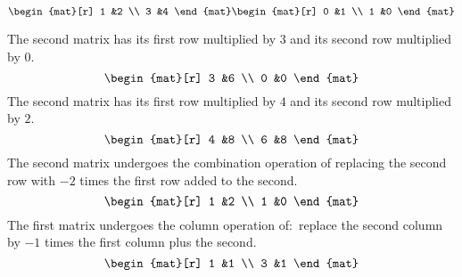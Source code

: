 \begin{exercises}
\begin{exparts*}
\begin{mat}[r]
               \end{mat} \)
      \partsitem \( \begin{mat}[r]
                 1  &2  \\
                 3  &4
               \end{mat}
               \begin{mat}[r]
                 0  &1  \\
                 1  &0
               \end{mat} \)
    \end{exparts*}
    \begin{answer}
      \begin{exparts}
        \partsitem The second matrix has its first row multiplied 
          by \( 3 \) and
          its second row multiplied by \( 0 \).
          \begin{equation*}
            \begin{mat}[r]
              3  &6  \\
              0  &0
            \end{mat}
          \end{equation*}
        \partsitem The second matrix has its first row multiplied 
          by \( 4 \) and
          its second row multiplied by \( 2 \).
          \begin{equation*}
            \begin{mat}[r]
              4  &8  \\
              6  &8
            \end{mat}
          \end{equation*}
        \partsitem The second matrix undergoes the combination operation
          of replacing the second row with \( -2 \) times the first row added
          to the second.
          \begin{equation*}
            \begin{mat}[r]
              1  &2  \\
              1  &0
            \end{mat}
          \end{equation*}
        \partsitem The first matrix undergoes the column operation of:~replace
          the
          second column by $-1$ times the first column plus the
          second.
          \begin{equation*}
            \begin{mat}[r]
              1  &1  \\
              3  &1
            \end{mat}

\end{equation*}
\end{exparts}
\end{answer}
\end{exercises}

